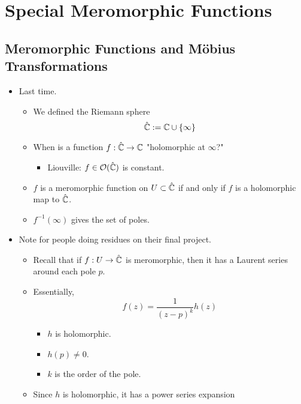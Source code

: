 \documentclass[../notes.tex]{subfiles}
\begin{document}
\chapter{Special Meromorphic Functions}
\section{Meromorphic Functions and M\"{o}bius Transformations}
\begin{itemize}
    \item {}Last time.
    \begin{itemize}
        \item We defined the Riemann sphere
        \begin{equation*}
            \hat{\mathbb{C}} := \mathbb{C}\cup\{\infty\}
        \end{equation*}
        \item When is a function $f:\hat{\mathbb{C}}\to\mathbb{C}$ "holomorphic at $\infty$?"
        \begin{itemize}
            \item Liouville: $f\in\mathcal{O}(\hat{\mathbb{C}})$ is constant.
        \end{itemize}
        \item $f$ is a meromorphic function on $U\subset\hat{\mathbb{C}}$ if and only if $f$ is a holomorphic map to $\hat{\mathbb{C}}$.
        \item $f^{-1}(\infty)$ gives the set of poles.
    \end{itemize}
    \item Note for people doing residues on their final project.
    \begin{itemize}
        \item Recall that if $f:U\to\hat{\mathbb{C}}$ is meromorphic, then it has a Laurent series around each pole $p$.
        \item Essentially,
        \begin{equation*}
            f(z) = \frac{1}{(z-p)^k}h(z)
        \end{equation*}
        \begin{itemize}
            \item $h$ is holomorphic.
            \item $h(p)\neq 0$.
            \item $k$ is the order of the pole.
        \end{itemize}
        \item Since $h$ is holomorphic, it has a power series expansion
        \begin{equation*}

\end{equation*}
\end{itemize}
\end{itemize}
\end{document}
